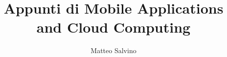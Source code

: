 \documentclass[12pt]{report}
\title{Appunti di Mobile Applications and Cloud Computing}
\author{Matteo Salvino}
\date{}
\begin{document}
\maketitle
\tableofcontents
\pagebreak








\begin{appendix}

\end{appendix}
\end{document}
